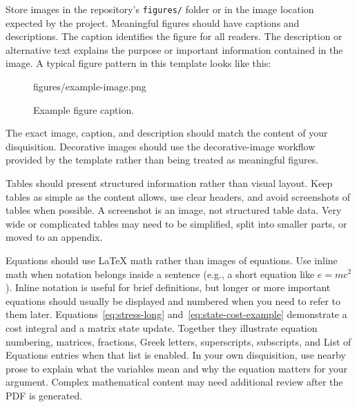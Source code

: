 Store images in the repository's \texttt{figures/} folder or in the image location expected by the project. Meaningful figures should have captions and descriptions. The caption identifies the figure for all readers. The description or alternative text explains the purpose or important information contained in the image. A typical figure pattern in this template looks like this:
\begin{ndsucodelisting}
\begin{figure}[htb]
\centering

{figures/example-image.png}

\caption{Example figure caption.}
\label{fig:example}


\end{figure}
\end{ndsucodelisting}

The exact image, caption, and description should match the content of your disquisition. Decorative images should use the decorative-image workflow provided by the template rather than being treated as meaningful figures.

Tables should present structured information rather than visual layout. Keep tables as simple as the content allows, use clear headers, and avoid screenshots of tables when possible. A screenshot is an image, not structured table data. Very wide or complicated tables may need to be simplified, split into smaller parts, or moved to an appendix.

Equations should use \LaTeX{} math rather than images of equations. Use inline math when notation belongs inside a sentence (e.g., a short equation like $e = mc^2$). Inline notation is useful for brief definitions, but longer or more important equations should usually be displayed and numbered when you need to refer to them later. Equations~\ref{eq:stress-long} and~\ref{eq:state-cost-example} demonstrate a cost integral and a matrix state update. Together they illustrate equation numbering, matrices, fractions, Greek letters, superscripts, subscripts, and List of Equations entries when that list is enabled. In your own disquisition, use nearby prose to explain what the variables mean and why the equation matters for your argument. Complex mathematical content may need additional review after the PDF is generated.

